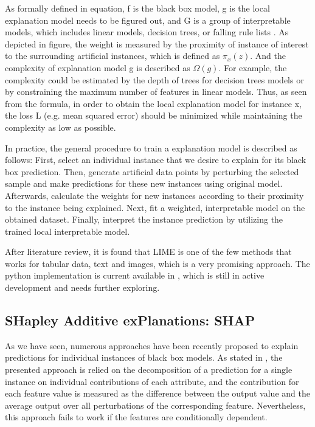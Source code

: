 As formally defined in equation, f is the black box model, g is the local explanation model needs to be figured out, and G is a group of interpretable models, which includes linear models, decision trees, or falling rule lists \cite{wang2015falling}. As depicted in figure, the weight is measured by the proximity of instance of interest to the surrounding artificial instances, which is defined as $\pi_{x}(z)$. And the complexity of explanation model g is described as $\Omega(g)$. For example, the complexity could be estimated by the depth of trees for decision trees models or by constraining the maximum number of features in linear models. Thus, as seen from the formula, in order to obtain the local explanation model for instance x, the loss L (e.g. mean squared error) should be minimized while maintaining the complexity as low as possible.

In practice, the general procedure to train a explanation model is described as follows: First, select an individual instance that we desire to explain for its black box prediction. Then, generate artificial data points by perturbing the selected sample and make predictions for these new instances using original model. Afterwards, calculate the weights for new instances according to their proximity to the instance being explained. Next, fit a weighted, interpretable model on the obtained dataset. Finally, interpret the instance prediction by utilizing the trained local interpretable model. 

After literature review, it is found that LIME is one of the few methods that works for tabular data, text and images, which is a very promising approach. The python implementation is current available in \cite{lime}, which is still in active development and needs further exploring. 

\subsection{SHapley Additive exPlanations: SHAP}

As we have seen, numerous approaches have been recently proposed to explain predictions for individual instances of black box models. As stated in \cite{robnik2008explaining}, the presented approach is relied on the decomposition of a prediction for a single instance on individual contributions of each attribute, and the contribution for each feature value is measured as the difference between the output value and the average output over all perturbations of the corresponding feature. Nevertheless, this approach fails to work if the features are conditionally dependent. 

